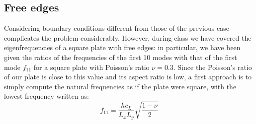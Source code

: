 \documentclass[a4paper]{article}
\begin{document}
\subsection{Free edges}

Considering boundary conditions different from those of the previous case complicates the problem considerably. However, during class we have covered the eigenfrequencies of a square plate with free edges: in particular, we have been given the ratios of the frequencies of the first 10 modes with that of the first mode $f_{11}$ for a square plate with Poisson's ratio $\nu = 0.3$. Since the Poisson's ratio of our plate is close to this value and its aspect ratio is low, a first approach is to simply compute the natural frequencies as if the plate were square, with the lowest frequency written as:
$$ f_{11} = \frac{hc_L}{L_x L_y} \sqrt{\frac{1-\nu}{2}} $$




\cite{leissa}
\cite{fletchross}
\cite{chker}



\printbibliography
\end{document}
